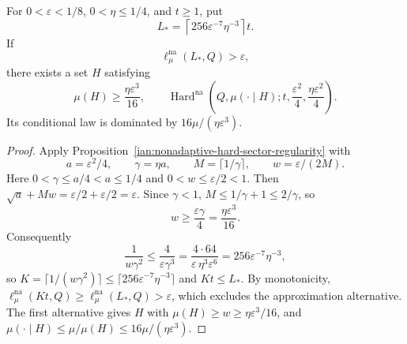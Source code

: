 \begin{corollary}
\label{ian:nonadaptive-hard-sector-explicit}
For \(0<\varepsilon<1/8\), \(0<\eta\le1/4\), and \(t\ge1\), put
\[
 L_*=\left\lceil256\varepsilon^{-7}\eta^{-3}\right\rceil t.
\]
If
\[
 \ell_\mu^{\mathrm{na}}(L_*,Q)>\varepsilon,
\]
there exists a set \(H\) satisfying
\[
 \mu(H)\ge\frac{\eta\varepsilon^3}{16},
 \qquad
 \operatorname{Hard}^{\mathrm{na}}
 \left(Q,\mu(\cdot\mid H);
 t,\frac{\varepsilon^2}{4},
 \frac{\eta\varepsilon^2}{4}\right).
\]
Its conditional law is dominated by
\(16\mu/(\eta\varepsilon^3)\).
\end{corollary}

\begin{proof}
Apply Proposition~\ref{ian:nonadaptive-hard-sector-regularity} with
\[
 a=\varepsilon^2/4,\qquad
 \gamma=\eta a,\qquad
 M=\lceil1/\gamma\rceil,\qquad
 w=\varepsilon/(2M).
\]
Here \(0<\gamma\le a/4<a\le1/4\) and \(0<w\le\varepsilon/2<1\). Then
\(\sqrt a+Mw=\varepsilon/2+\varepsilon/2=\varepsilon\). Since
\(\gamma<1\), \(M\le1/\gamma+1\le2/\gamma\), so
\[
 w\ge\frac{\varepsilon\gamma}4=\frac{\eta\varepsilon^3}{16}.
\]
Consequently
\[
 \frac1{w\gamma^2}\le\frac4{\varepsilon\gamma^3}
 =\frac{4\cdot64}{\varepsilon\,\eta^3\varepsilon^6}
 =256\varepsilon^{-7}\eta^{-3},
\]
so \(K=\lceil1/(w\gamma^2)\rceil\le\lceil256\varepsilon^{-7}\eta^{-3}\rceil\)
and \(Kt\le L_*\). By monotonicity,
\(\ell_\mu^{\mathrm{na}}(Kt,Q)\ge\ell_\mu^{\mathrm{na}}(L_*,Q)>\varepsilon\),
which excludes the approximation alternative. The first alternative
gives \(H\) with \(\mu(H)\ge w\ge\eta\varepsilon^3/16\), and
\(\mu(\cdot\mid H)\le\mu/\mu(H)\le16\mu/(\eta\varepsilon^3)\).
\end{proof}

